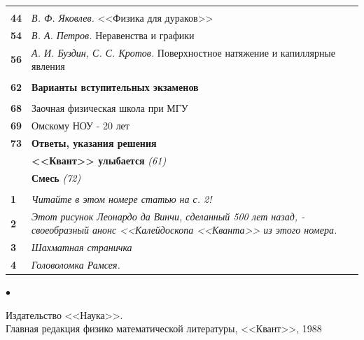 \documentclass[10dd, a5paper]{article}
\begin{document}
\begin{minipage}[t][][b]{0.55\linewidth}
\begin{tabularx}{\linewidth}{lX}
& \vspace{1dd}{\bf Практикум абитуриента}\\
{\bf 44} & {\itshape В. Ф. Яковлев.} <<Физика для дураков>>\\
{\bf 54} & {\itshape В. А. Петров.} Неравенства и графики\\
{\bf 56} & {\itshape А. И. Буздин, С. С. Кротов.} Поверхностное натяжение и капиллярные явления\\
\vspace{1dd}&\\
{\bf 62} & {\bf Варианты вступительных экзаменов}\\
& \vspace{1dd}{\bf Информация}\\
{\bf 68} & Заочная физическая школа при МГУ\\
{\bf 69} & Омскому НОУ - 20 лет\\
{\bf 73} & {\bf Ответы, указания решения}\\
& {\bf <<Квант>> улыбается} {\it (61)}\\
& {\bf Смесь} {\it (72)}\\
& \vspace{1dd}{\bf Наша обложка}\\
{\bf 1} & {\it Читайте в этом номере статью на с. 2!}\\
{\bf 2} & {\it Этот рисунок Леонардо да Винчи, сделанный 500 лет назад, - своеобразный анонс <<Калейдоскопа <<Кванта>> из этого номера.}\\
{\bf 3} & {\it Шахматная страничка}\\
{\bf 4} & {\it Головоломка Рамсея.}\\
\end{tabularx}
\vspace{1cm}
\medskip
\raggedleft
\begin{minipage}[l]{0.05\linewidth}
{\fontsize{20dd}{6dd}\selectfont $\bullet$}
\end{minipage}%
\raggedright
\begin{minipage}[с]{0.95\linewidth}
\fontsize{6dd}{6dd}\selectfont
\raggedright
\textcopyright Издательство <<Наука>>.\\
Главная редакция физико математической литературы, <<Квант>>, 1988 
\end{minipage}
\end{minipage}
\end{document}

